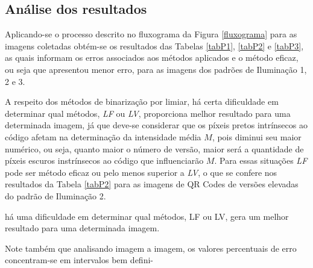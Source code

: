 \documentclass{ceel}
\begin{document}
\begin{multicols}{2}
\begin{minipage}[h]{\columnwidth}
\vspace{-0.1cm}
\caption{Imagens resultantes da Binarização Pós Equalização por Histograma para o QR Code 3 nos padrões de (a) Iluminação 1, (c) Iluminação 2 e (e) Iluminação 3, com suas respectivas imagens diferença em (b), (d) e (f).} \label{figEH}
\end{minipage}

\section{Análise dos resultados} \label{resultados}
Aplicando-se o processo descrito no fluxograma da Figura \ref{fluxograma} para as imagens coletadas obtém-se os resultados das Tabelas \ref{tabP1}, \ref{tabP2} e \ref{tabP3}, as quais informam os erros associados aos métodos aplicados e o método eficaz, ou seja que apresentou menor erro, para as imagens dos padrões de Iluminação 1, 2 e 3. 

A respeito dos métodos de binarização por limiar, há certa dificuldade em determinar qual métodos, \emph{LF} ou \emph{LV}, proporciona melhor resultado para uma determinada imagem, já que deve-se considerar que os píxeis pretos intrínsecos ao código afetam na determinação da intensidade média $M$, pois diminui seu maior numérico, ou seja, quanto maior o número de versão, maior será a quantidade de píxeis escuros instrínsecos ao código que influenciarão $M$. Para essas situações \emph{LF} pode ser método eficaz ou pelo menos superior a \emph{LV}, o que se confere nos resultados da Tabela \ref{tabP2} para as imagens de QR Codes de versões elevadas do padrão de Iluminação 2.

há uma dificuldade em determinar qual métodos, LF ou LV, gera um melhor resultado para uma determinada imagem.

Note também que analisando imagem a imagem, os valores percentuais de erro concentram-se em intervalos bem defini-\\



\end{multicols}
\end{document}
